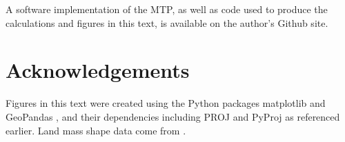 \documentclass[]{interact}
\begin{document}
A software implementation of the MTP, as well as code used to
produce the calculations and figures in this text,
is available on the author's Github site. \citep{trimetric}

\section{Acknowledgements}
Figures in this text were created using the Python packages matplotlib
\citep{matplotlib} and GeoPandas \citep{geopandas}, and their dependencies
including PROJ \citep{proj} and PyProj \citep{pyproj} as referenced earlier.
Land mass shape data come from \citet{natearth}.



\end{document}
